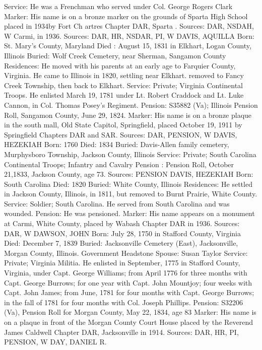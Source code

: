 Service: He was a Frenchman who served under Col. George Rogers Clark 
Marker: His name is on a bronze marker on the grounds of Sparta High School placed in 1934by Fort Ch artres Chapter DAR, Sparta . 
Sources: DAR, NSDAH, W 
Carmi, in 1936. 
Sources: DAR, HR, NSDAR, PI, W 
DAVIS, AQUILLA 
Born: St. Mary's County, Maryland 
Died : August 15, 1831 in Elkhart, Logan County, Illinois 
Buried: Wolf Creek Cemetery, near Sherman, Sangamon County 
Residences: He moved with his parents at an early age to Farquier County, Virginia. He came to Illinois in 1820, settling near Elkhart. removed to Fancy Creek Township, then back to Elkhart. 
Service: Private; Virginia Continental Troops. He enlisted March 19, 1781 under Lt. Robert Craddock and Lt. Luke Cannon, in Col. Thomas Posey's Regiment. 
Pension: S35882 (Va); Illinois Pension Roll, Sangamon County, June 29, 1824. 
Marker: His name is on a bronze plaque in the south mall, Old State Capitol, Springfield, placed October 19, 1911 by Springfield Chapters DAR and SAR. 
Sources: DAR, PENSION, W 
DAVIS, HEZEKIAH 
Born: 1760 
Died: 1834 
Buried: Davis-Allen family cemetery, Murphysboro Township, Jackson County, 
Illinois Service: Private; South Carolina Continental Troops; Infantry and Cavalry 
Pension : Pension Roll, October 21,1833, Jackson County, age 73. 
Sources: PENSION 
DAVIS, HEZEKIAH 
Born: South Carolina Died: 1820 
Buried: White County, Illinois 
Residences: He settled in Jackson County, Illinois, in 1811, but removed to Burnt Prairie, White County. Service: 
Soldier; South Carolina. He served from South Carolina and was wounded. 
Pension: He was pensioned. 
Marker: His name appears on a monument at Carmi, White County, placed by Wabash Chapter DAR in 1936. 
Sources: DAR, W 
DAWSON, JOHN 
Born: July 28, 1750 in Stafford County, Virginia 
Died: December 7, 1839 
Buried: Jacksonville Cemetery (East), Jacksonville, Morgan County, Illinois. Government Headstone 
Spouse: Susan Taylor 
Service: Private; Virginia Militia. He enlisted in September, 1775 in Stafford County, Virginia, under Capt. George Williams; from April 1776 for three months with Capt. George Burrows; for one year with Capt. John Mountjoy; four weeks with Capt. John James; from June, 1781 for four months with Capt. George Burrows; in the fall of 1781 for four months with Col. Joseph Phillips. 
Pension: S32206 (Va), Pension Roll for Morgan County, May 22, 1834, age 83 Marker: His name is on a plaque in front of the Morgan County Court House placed by the Reverend James Caldwell Chapter DAR, Jacksonville in 1914. 
Sources: DAR, HR, PI, PENSION, W 
DAY, DANIEL R.
